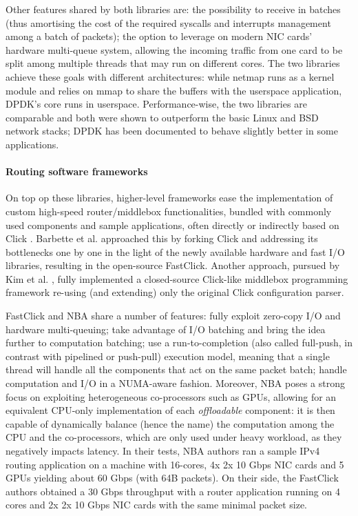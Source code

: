 \documentclass[12pt,a4paper,twoside]{book}
\begin{document}
Other features shared by both libraries are:
the possibility to receive in batches (thus amortising the cost of the required syscalls and interrupts management among a batch of packets);
the option to leverage on modern NIC cards' hardware multi-queue system, allowing the incoming traffic from one card to be split among multiple threads that may run on different cores. The two libraries achieve these goals with different architectures: while netmap runs as a kernel module and relies on mmap to share the buffers with the userspace application, DPDK's core runs in userspace.
Performance-wise, the two libraries are comparable and both were shown to outperform the basic Linux and BSD network stacks; DPDK has been documented to behave slightly better in some applications\cite{fastclick}.


\paragraph{Routing software frameworks} On top op these libraries, higher-level frameworks ease the implementation of custom high-speed router/middlebox functionalities, bundled with commonly used components and sample applications, often directly or indirectly based on Click \cite{click}.
Barbette et al.\cite{fastclick} approached this by forking Click and addressing its bottlenecks one by one in the light of the newly available hardware and fast I/O libraries, resulting in the open-source FastClick. Another approach, pursued by Kim et al. \cite{nba}, fully implemented a closed-source Click-like middlebox programming framework re-using (and extending) only the original Click configuration parser.

FastClick and NBA share a number of features:
fully exploit zero-copy I/O and hardware multi-queuing;
take advantage of I/O batching and bring the idea further to computation batching;
use a run-to-completion (also called full-push, in contrast with pipelined or push-pull) execution model, meaning that a single thread will handle all the components that act on the same packet batch;
handle computation and I/O in a NUMA-aware fashion.
Moreover, NBA poses a strong focus on exploiting heterogeneous co-processors such as GPUs, allowing for an equivalent CPU-only implementation of each \emph{offloadable} component: it is then capable of dynamically balance (hence the name) the computation among the CPU and the co-processors, which are only used under heavy workload, as they negatively impacts latency. In their tests, NBA authors ran a sample IPv4 routing application on a machine with 16-cores, 4x 2x 10 Gbps NIC cards and 5 GPUs yielding about 60 Gbps (with 64B packets). On their side, the FastClick authors obtained a 30 Gbps throughput with a router application running on 4 cores and 2x 2x 10 Gbps NIC cards with the same minimal packet size. 
\end{document}
